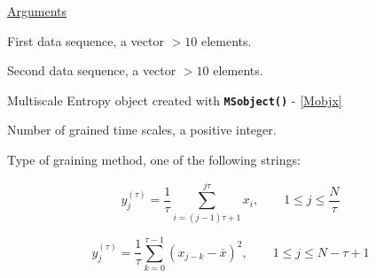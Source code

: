 \documentclass[12pt, a4paper, titlepage, openany]{book}
\begin{document}
\noindent \ul{Arguments}
\begin{description}[labelsep=1cm, labelwidth=2cm, nosep, style=multiline,leftmargin=3cm]\footnotesize
\item[\texttt{Sig1}]		First data sequence, a vector $>10$ elements.
\item[\texttt{Sig2}]		Second data sequence, a vector $>10$ elements.
\item[\texttt{Mobj}]	Multiscale Entropy object created with \texttt{\textbf{MSobject()}} - \ref{Mobjx}
\item[\texttt{Scales}]		Number of grained time scales, a positive integer.
\item[\texttt{Methodx}]		Type of graining method, one of the following strings:
	\begin{description}[labelsep=8em, labelwidth=10em, nosep,style=multiline,leftmargin=3cm]
	\item[\texttt{"coarse"}]	\cite{MS1}
	\[y^{(\tau)}_{j} = \frac{1}{\tau} \sum^{j\tau}_{i=(j-1)\tau+1} x_{i},\qquad  1\leq j\leq \frac{N}{\tau}\] 
	
	\item[\texttt{"generalized"}]	\cite{MS12}
	\[y^{(\tau)}_{j} = \frac{1}{\tau} \sum^{\tau-1}_{k=0} (x_{j-k} - \bar{x})^2,	\qquad  1\leq j\leq N-\tau+1 \]		
	

\end{description}
\end{description}
\end{document}
